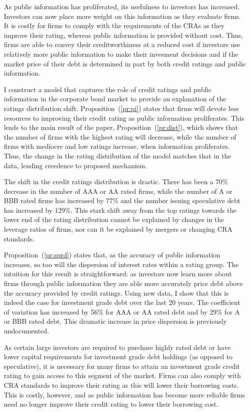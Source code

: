 \documentclass[notitlepage]{article}
\begin{document}
As public information has proliferated, its usefulness to investors has increased. Investors can now place more weight on this information as they evaluate firms. It is costly for firms to comply with the requirements of the CRAs as they improve their rating, whereas public information is provided without cost. Thus, firms are able to convey their creditworthiness at a reduced cost if investors use relatively more public information to make their invesment decisions and if the market price of their debt is determined in part by both credit ratings and public information.

I construct a model that captures the role of credit ratings and public information in the corporate bond market to provide an explanation of the ratings distribution shift. Proposition~(\ref{pr:pi}) states that firms will devote less resources to improving their credit rating as public information proliferates. This leads to the main result of the paper, Proposition~(\ref{pr:dist}), which shows that the number of firms with the highest rating will decrease, while the number of firms with mediocre and low ratings increase, when information proliferates. Thus, the change in the rating distribution of the model matches that in the data, lending creedence to proposed mechanism.

The shift in the credit ratings distribution is drastic. There has been a 70\% decrease in the number of AAA or AA rated firms, while the number of A or BBB rated firms has increased by 77\% and the number issuing speculative debt has increased by 129\%. This stark shift away from the top ratings towards the lower end of the rating distribution cannot be explained by changes in the leverage ratios of firms, nor can it be explained by mergers or changing CRA standards. 

Proposition~(\ref{pr:sprd}) states that, as the accuracy of public information increases, so too will the dispersion of interest rates within a rating group. The intuition for this result is straightforward: as investors now learn more about firms through public information they are able more accurately price debt above the accuracy provided by credit ratings. Using new data, I show that this is indeed the case for investment grade debt over the last 20 years. The coefficient of variation has increased by 56\% for AAA or AA rated debt and by 29\% for A or BBB rated debt. This dramatic increase in price dispersion is previously undocumented. 

As certain large investors are required to purchase highly rated debt or have lower capital requirements for investment grade debt holdings (as opposed to speculative), it is necessary for many firms to attain an investment grade credit rating to gain access to this segment of the market. Firms can also comply with CRA standards to improve their rating as this will lower their borrowing costs. This is costly, however, and as public information has become more reliable firms need no longer improve their credit rating to lower their borrowing cost. 
\end{document}

